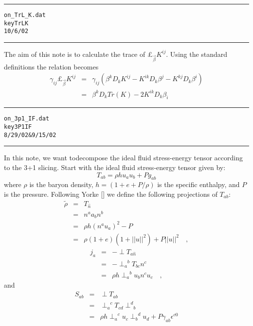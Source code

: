 \documentclass[12pt]{article}
\begin{document}
\clearpage
\vspace{5mm}
\hrule
\begin{alltt}
  on_TrL_K.dat
  key TrLK
  10/6/02
\end{alltt}
\hrule
\vspace{5mm}

The aim of this note is to calculate the trace of $ \pounds_{{\vec \beta}} {K}^{i j} $.
Using the standard definitions the relation becomes
\begin{eqnarray}\label{TrLK_1}
{\gamma}_{i j} \pounds_{{\vec \beta}} {K}^{i j}
& = &
{\gamma}_{i j} \left( {\beta}^{k} D_{k} {K}^{i j}
- {K}^{i k} D_{k} {\beta}^{j}
- {K}^{k j} D_{k} {\beta}^{i} \right) \nonumber \\
& = &
{\beta}^{k} D_{k} Tr( K ) - 2 {K}^{i k} D_{k} {\beta}_{i}
\end{eqnarray}
\clearpage
\vspace{5mm}
\hrule
\begin{alltt}
  on_3p1_IF.dat
  key 3P1IF
  8/29/02 & 9/15/02
\end{alltt}
\hrule
\vspace{5mm}

In this note, we want todecompose the ideal fluid stress-energy tensor
according to the 3+1 slicing.
Start with the ideal fluid stress-energy tensor given by:
\begin{equation}\label{3P1IF_1}
{ T } _ { ab } = \rho h {u}_{a} {u}_{b} + P {g}_{a b}
\end{equation}
where $ \rho $ is the baryon density, $ h = \left( 1 + e + P / \rho \right) $ is the
specific enthalpy, and $ P $ is the pressure.
Following Yorke [\cite{YYYY)}] we define the following projections
of $ { T } _ { ab } $:
\begin{eqnarray}\label{3P1IF_2}
{\tilde \rho} & = & { T } _ { {\hat n} } \nonumber \\
& = & {n ^ a} { a } _ { b } {n ^ b} \nonumber \\
& = & \rho h \left( {n ^ a} {u}_{a} \right) ^2 - P \nonumber \\
& = & \rho ( 1 + e ) \left( 1 + || u || ^2 \right) + P || u || ^2 \quad ,
\end{eqnarray}
\begin{eqnarray}\label{3P1IF_3}
{ j } _ { a } & = & - \perp T_{a {\hat n} } \nonumber \\
& = & - {\perp _ a}^{ b } { T } _ { bc } {n ^ c} \nonumber \\
& = & \rho h {\perp _ a}^{ b } {u}_{b} {n ^ c} {u}_{c} \quad ,
\end{eqnarray}
and
\begin{eqnarray}\label{3P1IF_4}
{ S } _ { ab } & = & \perp { T } _ { ab } \nonumber \\
& = & {\perp _ a}^{ c } { T } _ { cd } {\perp ^ d}_{ b } \nonumber \\
& = & \rho h {\perp _ a}^{ c } {u}_{c} {\perp _ b}^{ d } {u}_{d} + P {\gamma}_{a b} {\epsilon }^{ c0 }
\end{eqnarray}
\end{document}
